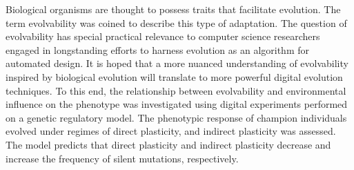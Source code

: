 Biological organisms are thought to possess traits that facilitate evolution.
The term evolvability was coined to describe this type of adaptation.
The question of evolvability has special practical relevance to computer science researchers engaged in longstanding efforts to harness evolution as an algorithm for automated design.
It is hoped that a more nuanced understanding of evolvability inspired by biological evolution will translate to more powerful digital evolution techniques.
To this end, the relationship between evolvability and environmental influence on the phenotype was investigated using digital experiments performed on a genetic regulatory model.
The phenotypic response of champion individuals evolved under regimes of direct plasticity, and indirect plasticity was assessed.
The model predicts that direct plasticity and indirect plasticity decrease and increase the frequency of silent mutations, respectively.

